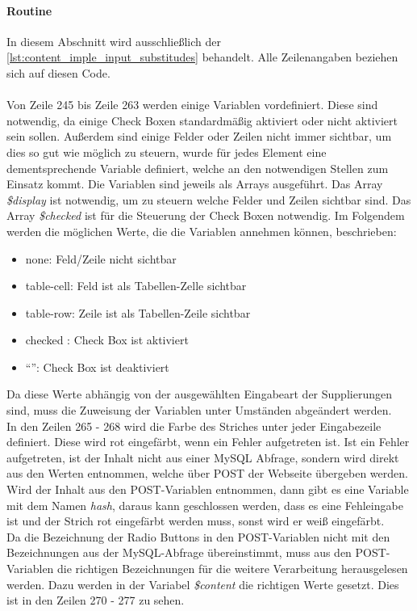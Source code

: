 \paragraph{Routine}
In diesem Abschnitt wird ausschließlich der \autoref{lst:content_imple_input_substitudes} behandelt. Alle Zeilenangaben beziehen sich auf diesen Code.\\
\\
Von Zeile 245 bis Zeile 263 werden einige Variablen vordefiniert. Diese sind notwendig, da einige Check Boxen standardmäßig aktiviert oder nicht aktiviert sein sollen. Außerdem sind einige Felder oder Zeilen nicht immer sichtbar, um dies so gut wie möglich zu steuern, wurde für jedes Element eine dementsprechende Variable definiert, welche an den notwendigen Stellen zum Einsatz kommt. Die Variablen sind jeweils als Arrays ausgeführt. Das Array \textit{\$display} ist notwendig, um zu steuern welche Felder und Zeilen sichtbar sind. Das Array \textit{\$checked} ist für die Steuerung der Check Boxen notwendig.
Im Folgendem werden die möglichen Werte, die die Variablen annehmen können, beschrieben:
\begin{itemize}
	\item none: Feld/Zeile nicht sichtbar
	\item table-cell: Feld ist als Tabellen-Zelle sichtbar
	\item table-row: Zeile ist als Tabellen-Zeile sichtbar
	\item checked : Check Box ist aktiviert
	\item \enquote{}: Check Box ist deaktiviert
\end{itemize}
Da diese Werte abhängig von der ausgewählten Eingabeart der Supplierungen sind, muss die Zuweisung der Variablen unter Umständen abgeändert werden.\\
In den Zeilen 265 - 268 wird die Farbe des Striches unter jeder Eingabezeile definiert. Diese wird rot eingefärbt, wenn ein Fehler aufgetreten ist. Ist ein Fehler aufgetreten, ist der Inhalt nicht aus einer MySQL Abfrage, sondern wird direkt aus den Werten entnommen, welche über POST der Webseite übergeben werden. Wird der Inhalt aus den POST-Variablen entnommen, dann gibt es eine Variable mit dem Namen \textit{hash}, daraus kann geschlossen werden, dass es eine Fehleingabe ist und der Strich rot eingefärbt werden muss, sonst wird er weiß eingefärbt.\\
Da die Bezeichnung der Radio Buttons in den POST-Variablen nicht mit den Bezeichnungen aus der MySQL-Abfrage übereinstimmt, muss aus den POST-Variablen die richtigen Bezeichnungen für die weitere Verarbeitung herausgelesen werden. Dazu werden in der Variabel \textit{\$content} die richtigen Werte gesetzt. Dies ist in den Zeilen 270 - 277 zu sehen.\\
